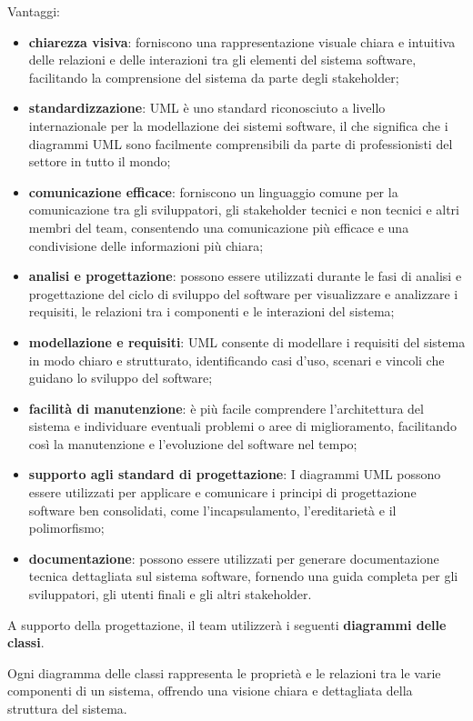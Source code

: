 Vantaggi:
\begin{itemize}
	\item \textbf{chiarezza visiva}: forniscono una rappresentazione visuale chiara e intuitiva delle relazioni e delle interazioni tra gli elementi del sistema software, facilitando la comprensione del sistema da parte degli stakeholder;
	\item \textbf{standardizzazione}: UML è uno standard riconosciuto a livello internazionale per la modellazione dei sistemi software, il che significa che i diagrammi UML sono facilmente comprensibili da parte di professionisti del settore in tutto il mondo;
	\item \textbf{comunicazione efficace}: forniscono un linguaggio comune per la comunicazione tra gli sviluppatori, gli stakeholder tecnici e non tecnici e altri membri del team, consentendo una comunicazione più efficace e una condivisione delle informazioni più chiara;
	\item \textbf{analisi e progettazione}: possono essere utilizzati durante le fasi di analisi e progettazione del ciclo di sviluppo del software per visualizzare e analizzare i requisiti, le relazioni tra i componenti e le interazioni del sistema;
	\item \textbf{modellazione e requisiti}: UML consente di modellare i requisiti del sistema in modo chiaro e strutturato, identificando casi d'uso, scenari e vincoli che guidano lo sviluppo del software;
	\item \textbf{facilità di manutenzione}: è più facile comprendere l'architettura del sistema e individuare eventuali problemi o aree di miglioramento, facilitando così la manutenzione e l'evoluzione del software nel tempo;
	\item \textbf{supporto agli standard di progettazione}: I diagrammi UML possono essere utilizzati per applicare e comunicare i principi di progettazione software ben consolidati, come l'incapsulamento, l'ereditarietà e il polimorfismo;
	\item \textbf{documentazione}: possono essere utilizzati per generare documentazione tecnica dettagliata sul sistema software, fornendo una guida completa per gli sviluppatori, gli utenti finali e gli altri stakeholder.
\end{itemize}
\newpage
\begin{flushleft}
A supporto della progettazione, il team utilizzerà i seguenti \textbf{diagrammi delle classi}.
\end{flushleft}
Ogni diagramma delle classi rappresenta le proprietà e le relazioni tra le varie componenti di un sistema, offrendo una visione chiara e dettagliata della struttura del sistema.\\
